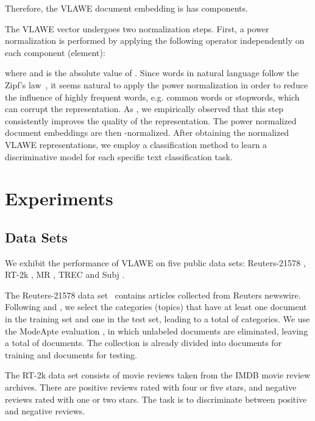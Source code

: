 \documentclass[11pt,a4paper]{article}
\begin{document}
Therefore, the VLAWE document embedding is has  components. 

The VLAWE vector  undergoes two normalization steps. First, a power normalization is performed by applying the following operator independently on each component (element):

where  and  is the absolute value of . Since words in natural language follow the Zipf's law~\cite{Powers-ACL-1998}, it seems natural to apply the power normalization in order to reduce the influence of highly frequent words, e.g. common words or stopwords, which can corrupt the representation. As , we empirically observed that this step consistently improves the quality of the representation. The power normalized document embeddings are then -normalized. After obtaining the normalized VLAWE representations, we employ a classification method to learn a discriminative model for each specific text classification task.

\vspace*{-0.1cm}
\section{Experiments}
\label{sec:E}
\vspace*{-0.1cm}
\subsection{Data Sets}
\vspace*{-0.1cm}

We exhibit the performance of VLAWE on five public data sets: Reuters-21578 \cite{reuters-21578}, RT-2k \cite{Pang-ACL-2004}, MR \cite{Pang-ACL-2005}, TREC \cite{Li-COLING-2002} and Subj \cite{Pang-ACL-2004}.

The Reuters-21578 data set~\cite{reuters-21578} contains articles collected from Reuters newswire. Following  and , we select the categories (topics) that have at least one document in the training set and one in the test set, leading to a total of  categories. We use the ModeApte evaluation \cite{Xue-TKDE-2009}, in which unlabeled documents are eliminated, leaving a total of  documents. The collection is already divided into  documents for training and  documents for testing. 

The RT-2k data set \cite{Pang-ACL-2004} consists of  movie reviews taken from the IMDB movie review archives. There are  positive reviews rated with four or five stars, and  negative reviews rated with one or two stars. The task is to discriminate between positive and negative reviews.
\end{document}
